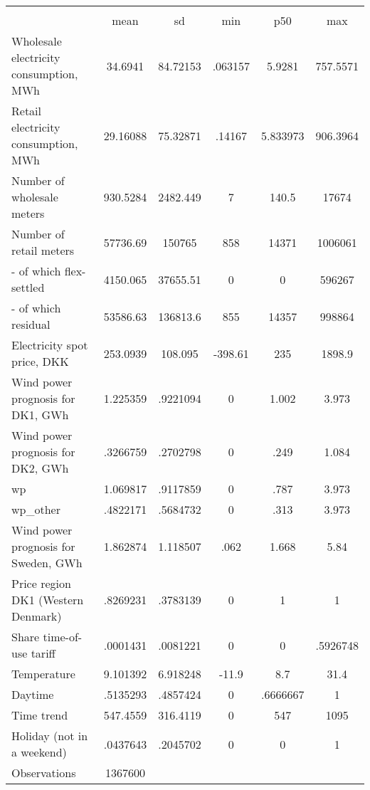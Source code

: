 \begin{tabular}{l*{1}{ccccc}}
\hline\hline
                    &\multicolumn{5}{c}{}                                            \\
                    &        mean&          sd&         min&         p50&         max\\
\midrule
Wholesale electricity consumption, MWh&     34.6941&    84.72153&     .063157&      5.9281&    757.5571\\
Retail electricity consumption, MWh&    29.16088&    75.32871&      .14167&    5.833973&    906.3964\\
Number of wholesale meters&    930.5284&    2482.449&           7&       140.5&       17674\\
Number of retail meters&    57736.69&      150765&         858&       14371&     1006061\\
- of which flex-settled&    4150.065&    37655.51&           0&           0&      596267\\
- of which residual &    53586.63&    136813.6&         855&       14357&      998864\\
Electricity spot price, DKK&    253.0939&     108.095&     -398.61&         235&      1898.9\\
Wind power prognosis for DK1, GWh&    1.225359&    .9221094&           0&       1.002&       3.973\\
Wind power prognosis for DK2, GWh&    .3266759&    .2702798&           0&        .249&       1.084\\
wp                  &    1.069817&    .9117859&           0&        .787&       3.973\\
wp\_other            &    .4822171&    .5684732&           0&        .313&       3.973\\
Wind power prognosis for Sweden, GWh&    1.862874&    1.118507&        .062&       1.668&        5.84\\
Price region DK1 (Western Denmark)&    .8269231&    .3783139&           0&           1&           1\\
Share time-of-use tariff&    .0001431&    .0081221&           0&           0&    .5926748\\
Temperature         &    9.101392&    6.918248&       -11.9&         8.7&        31.4\\
Daytime             &    .5135293&    .4857424&           0&    .6666667&           1\\
Time trend          &    547.4559&    316.4119&           0&         547&        1095\\
Holiday (not in a weekend)&    .0437643&    .2045702&           0&           0&           1\\
\midrule
Observations        &     1367600&            &            &            &            \\
\bottomrule\end{tabular}
